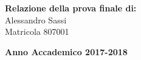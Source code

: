 \begin{titlepage}
        \begin{flushright}
            {\large \textbf{Relazione della prova finale di:}} \\
            \large{Alessandro Sassi} \\
            \large{Matricola 807001}
        \end{flushright}
        
        \vspace{40mm}
        \begin{center}
            {\large{\bf Anno Accademico 2017-2018}}
        \end{center}

        \restoregeometry
        
    \end{titlepage}
    

   
